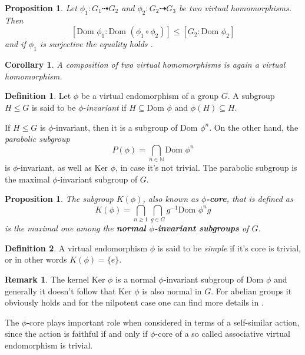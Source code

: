 \documentclass[a4paper,12pt]{amsart}
\newtheorem{proposition}[theorem]{Proposition}
\newtheorem{corollary}{Corollary}[theorem]
\theoremstyle{definition}
\newtheorem{definition}{Definition}
\newtheorem{remark}{Remark}
\newcommand{\Dom}{\text{Dom }}
\newcommand{\Ker}{\text{Ker }}
\begin{document}
	
	\begin{proposition}
		Let $\phi_1: G_1 \dashrightarrow G_2$ and $\phi_2: G_2 \dashrightarrow G_3$ be two virtual homomorphisms. Then 
		$$
		[\Dom \phi_1 : \Dom (\phi_1 \circ \phi_2)] \le [G_2: \Dom \phi_2]
		$$
		and if $\phi_1$ is surjective the equality holds .
		
	\end{proposition}
	
	
	\begin{corollary}
		A composition of two virtual homomorphisms is again a virtual homomorphism.
	\end{corollary}
	
	\begin{definition}
		Let $\phi$ be a virtual endomorphism of a group $G$. A subgroup $H \le G$ is said to be $\phi$-\textit{invariant} if $H \subseteq \Dom \phi$ and $\phi(H) \subseteq H$.
	\end{definition}
	
	
	If $H \le G$ is $\phi$-invariant, then it is a subgroup of $\Dom \phi^n$. On the other hand, the \textit{parabolic subgroup}
	$$
	P(\phi) = \bigcap_{n \in \mathbb{N}} \Dom \phi^n
	$$  
	is $\phi$-invariant, as well as $ \Ker \phi$, in case it's not trivial. The parabolic subgroup is the maximal $\phi$-invariant subgroup of $G$.
	
	\begin{proposition}
		The subgroup $K(\phi)$, also known as \textbf{$\phi$-core}, that is defined as  
		$$
		K(\phi) = \bigcap_{n\ge1}\bigcap_{g \in G} g^{-1} \Dom \phi^n g
		$$
		is the maximal one among the \textbf{normal $\phi$-invariant subgroups} of $G$.
	\end{proposition}
	
	
	\begin{definition}
	A virtual endomorphism $\phi$ is said to be \textit{simple} if it's core is trivial, or in other words $K(\phi) = \{e\}$.
	
	\end{definition}
	\begin{remark}
		The kernel $\Ker \phi$ is a normal $\phi$-invariant subgroup of $\Dom \phi$ and generally it doesn't follow that $\Ker \phi$ is also normal in $G$. For abelian groups it obviously holds and for the nilpotent case one can find more details in \cite{nilpotent_kernel}.
	\end{remark}
	
	The $\phi$-core plays important role when considered in terms of a self-similar action, since the action is faithful if and only if $\phi$-core of a so called associative virtual endomorphism is trivial.  
	
\end{document}
